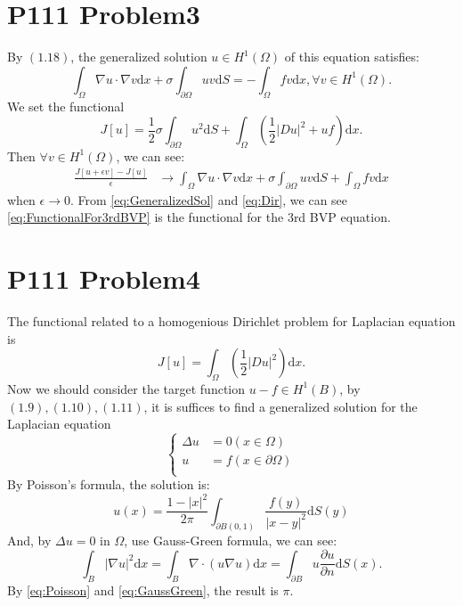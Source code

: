 \documentclass[a4paper]{ctexart}
\newcommand{\dif}{\mathrm{d}}
\newcommand{\pdfFrac}[2]{\frac{\partial #1}{\partial #2}}
\begin{document}
\section*{P111 Problem3}
By $(1.18)$, the generalized solution $u\in H^{1}(\Omega)$ of this equation satisfies:
\begin{equation}
    \label{eq:GeneralizedSol}
    \int_{\Omega}\nabla u\cdot\nabla v\dif x+\sigma\int_{\partial\Omega}uv\dif S=-\int_{\Omega}fv\dif x, \forall v\in H^{1}(\Omega).
\end{equation}
We set the functional
\begin{equation}
    \label{eq:FunctionalFor3rdBVP}
    J[u]=\frac{1}{2}\sigma\int_{\partial\Omega}u^{2}\dif S+\int_{\Omega}(\frac{1}{2}|Du|^2+uf)\dif x.
\end{equation}
Then $\forall v\in H^{1}(\Omega)$, we can see:
\begin{equation}
    \label{eq:Dir}
    \begin{aligned}
        \frac{J[u+\epsilon v]-J[u]}{\epsilon}&\rightarrow    \int_{\Omega}\nabla u\cdot\nabla v\dif x+\sigma\int_{\partial\Omega}uv\dif S+\int_{\Omega}fv\dif x
    \end{aligned}
\end{equation}
when $\epsilon\rightarrow 0$. From \eqref{eq:GeneralizedSol} and \eqref{eq:Dir}, we can see \eqref{eq:FunctionalFor3rdBVP} is the functional for the 3rd BVP equation.
\section*{P111 Problem4}
The functional related to a homogenious Dirichlet problem for Laplacian equation is
\begin{equation}
    J[u]=\int_{\Omega}(\frac{1}{2}|Du|^2)\dif x.
\end{equation}
Now we should consider the target function $u-f\in H^{1}(B)$, by $(1.9),(1.10),(1.11)$, it is suffices to find a generalized solution for the Laplacian equation
\begin{equation}
    \left\{
        \begin{aligned}
            \Delta u&=0(x\in\Omega)\\
            u&=f(x\in\partial\Omega)\\
        \end{aligned}
    \right.
\end{equation}
By Poisson's formula, the solution is:
\begin{equation}
    \label{eq:Poisson}
    u(x)=\frac{1-|x|^2}{2\pi}\int_{\partial B(0,1)}\frac{f(y)}{|x-y|^{2}}\dif S(y)
\end{equation} 
And, by $\Delta u=0$ in $\Omega$, use Gauss-Green formula, we can see:
\begin{equation}
    \label{eq:GaussGreen}
    \int_{B}|\nabla u|^{2}\dif x=\int_{B}\nabla\cdot(u\nabla u)\dif x=\int_{\partial B}u\pdfFrac{u}{n}\dif S(x).
\end{equation}
By \eqref{eq:Poisson} and \eqref{eq:GaussGreen}, the result is $\pi$.
\end{document}
